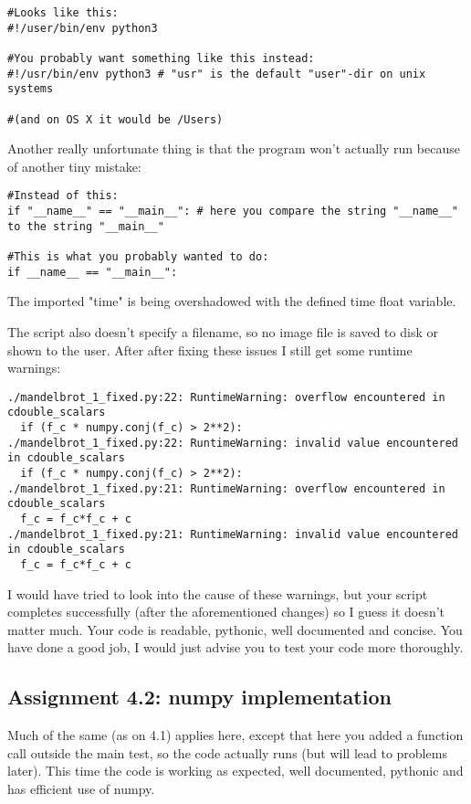 \documentclass[a4paper]{article}
\begin{document}
\begin{verbatim}
#Looks like this:
#!/user/bin/env python3

#You probably want something like this instead:
#!/usr/bin/env python3 # "usr" is the default "user"-dir on unix systems

#(and on OS X it would be /Users)
\end{verbatim}

Another really unfortunate thing is that the program won't actually run because of another tiny mistake:

\begin{verbatim}
#Instead of this:
if "__name__" == "__main__": # here you compare the string "__name__" to the string "__main__"

#This is what you probably wanted to do:
if __name__ == "__main__":
\end{verbatim}

The imported "time" is being overshadowed with the defined time float variable.

The script also doesn't specify a filename, so no image file is saved to disk or shown to the user.
After after fixing these issues I still get some runtime warnings:

\begin{verbatim}
./mandelbrot_1_fixed.py:22: RuntimeWarning: overflow encountered in cdouble_scalars
  if (f_c * numpy.conj(f_c) > 2**2):
./mandelbrot_1_fixed.py:22: RuntimeWarning: invalid value encountered in cdouble_scalars
  if (f_c * numpy.conj(f_c) > 2**2):
./mandelbrot_1_fixed.py:21: RuntimeWarning: overflow encountered in cdouble_scalars
  f_c = f_c*f_c + c
./mandelbrot_1_fixed.py:21: RuntimeWarning: invalid value encountered in cdouble_scalars
  f_c = f_c*f_c + c
\end{verbatim}

I would have tried to look into the cause of these warnings, but your script completes successfully (after the aforementioned changes) so I guess it doesn't matter much. Your code is readable, pythonic, well documented and concise. You have done a good job, I would just advise you to test your code more thoroughly.

\subsection*{Assignment 4.2:  numpy implementation} \label{sec:assignment5.2}
Much of the same (as on 4.1) applies here, except that here you added a function call outside the main test, so the code actually runs (but will lead to problems later). This time the code is working as expected, well documented, pythonic and has efficient use of numpy.
\end{document}
